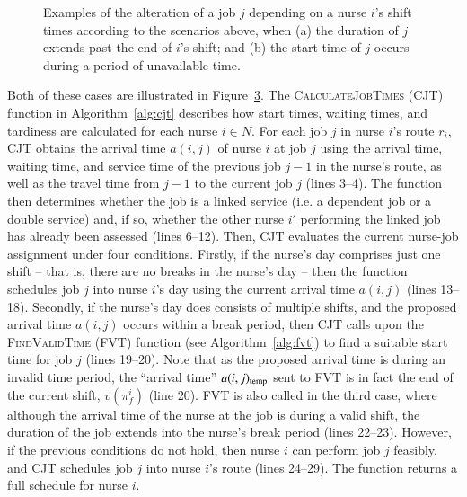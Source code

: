 \documentclass[a4paper,11pt,authoryear]{elsarticle}
\begin{document}
\begin{figure}[h!]
	\centering	
	\begin{subfigure}[h]{\textwidth}
		\centering
		
		\vspace{-2mm}\caption{}
		\label{fig:itemsinfeas}
		\vspace{2mm}
	\end{subfigure}
	\begin{subfigure}[h]{\textwidth}
		\centering
		
		\vspace{-2mm}\caption{}
		\label{fig:itemsfeas}
	\end{subfigure}
	\caption{Examples of the alteration of a job $j$ depending on a nurse $i$'s shift times according to the scenarios above, when (a) the duration of $j$ extends past the end of $i$'s shift; and (b) the start time of $j$ occurs during a period of unavailable time.}
	\label{fig:itemsaligned}
\end{figure}

\noindent Both of these cases are illustrated in Figure~\ref{fig:itemsaligned}. The \textsc{CalculateJobTimes} (CJT) function in Algorithm~\ref{alg:cjt} describes how start times, waiting times, and tardiness are calculated for each nurse $i \in N$. For each job $j$ in nurse $i$'s route $r_i$, CJT obtains the arrival time $a(i,j)$ of nurse $i$ at job $j$ using the arrival time, waiting time, and service time of the previous job $j-1$ in the nurse's route, as well as the travel time from $j-1$ to the current job $j$ (lines 3--4). The function then determines whether the job is a linked service (i.e. a dependent job or a double service) and, if so, whether the other nurse $i'$ performing the linked job has already been assessed (lines 6--12). Then, CJT evaluates the current nurse-job assignment under four conditions. Firstly, if the nurse's day comprises just one shift -- that is, there are no breaks in the nurse's day -- then the function schedules job $j$ into nurse $i$'s day using the current arrival time $a(i,j)$ (lines 13--18). Secondly, if the nurse's day does consists of multiple shifts, and the proposed arrival time $a(i,j)$ occurs within a break period, then CJT calls upon the \textsc{FindValidTime} (FVT) function (see Algorithm~\ref{alg:fvt}) to find a suitable start time for job $j$ (lines 19--20). Note that as the proposed arrival time is during an invalid time period, the ``arrival time'' $a(i,j)_{\textup{temp}}$ sent to FVT is in fact the end of the current shift, $v(\pi_{f}^{i})$ (line 20). FVT is also called in the third case, where although the arrival time of the nurse at the job is during a valid shift, the duration of the job extends into the nurse's break period (lines 22--23). However, if the previous conditions do not hold, then nurse $i$ can perform job $j$ feasibly, and CJT schedules job $j$ into nurse $i$'s route (lines 24--29). The function returns a full schedule for nurse $i$.
\end{document}
